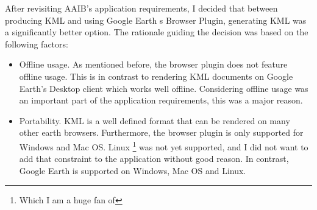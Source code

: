 After revisiting AAIB's application requirements, I decided that between producing KML and using Google Earth
s Browser Plugin, generating KML was a significantly better option. The rationale guiding the decision was based on the following factors:

\begin{itemize}
\item Offline usage. As mentioned before, the browser plugin does not feature offline usage. This is in contrast to rendering KML documents on Google Earth's Desktop client which works well offline. Considering offline usage was an important part of the application requirements, this was a major reason.
\item Portability. KML is a well defined format that can be rendered on many other earth browsers. Furthermore, the browser plugin is only supported for Windows and Mac OS\citep{google:browser-plugin}. Linux \footnote{Which I am a huge fan of} was not yet supported, and I did not want to add that constraint to the application without good reason. In contrast, Google Earth is supported on Windows, Mac OS and Linux.
\end{itemize}
